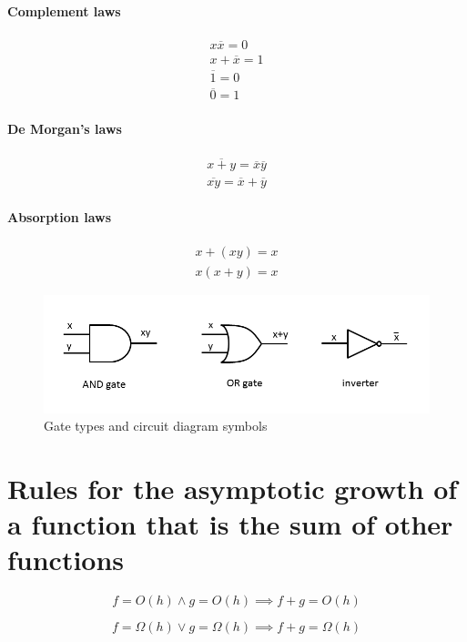 \documentclass[a4paper]{article}
\begin{document}
\paragraph{Complement laws}
\begin{align*}
  x  \overline{ x }= 0 \\
  x + \overline{ x} = 1 \\
  \overline{ 1} = 0 \\
  \overline{ 0} = 1
\end{align*}
\paragraph{De Morgan's laws}
\begin{align*}
  \overline{ x + y} = \overline{ x}  \overline{ y} \\
  \overline{ x y} = \overline{ x} + \overline{ y}
\end{align*}
\paragraph{Absorption laws}
\begin{align*}
  x + (x  y) = x \\
  x  (x + y) = x
\end{align*}
\begin{figure}
  \caption{Gate types and circuit diagram symbols}
  \includegraphics[width=6.5in]{3gates.png}
\end{figure}
\section{Rules for the asymptotic growth of a function that is the sum of other functions}
    
    \begin{equation*}
      f = O(h) \land g = O(h) \implies f + g = O(h)
    \end{equation*}
    
    \begin{equation*}
      f = \Omega (h) \lor g = \Omega (h) \implies f + g = \Omega (h)
    \end{equation*}
    
\end{document}
